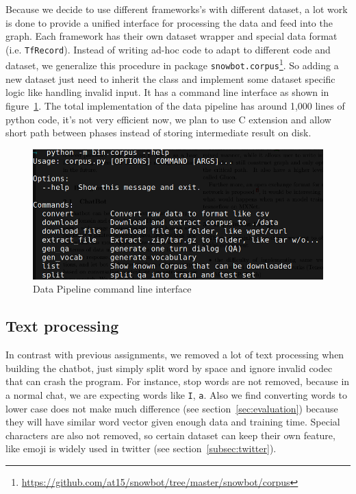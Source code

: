 \documentclass{article}
\begin{document}
Because we decide to use different frameworks's with different dataset, a lot work is done to provide a unified interface
for processing the data and feed into the graph.
Each framework has their own dataset wrapper and special data format (i.e. \verb+TfRecord+).
Instead of writing ad-hoc code to adapt to different code and dataset,
we generalize this procedure in package \verb+snowbot.corpus+\footnote{\url{https://github.com/at15/snowbot/tree/master/snowbot/corpus}}.
So adding a new dataset just need to inherit the class and implement some dataset specific logic like handling invalid input.
It has a command line interface as shown in figure~\ref{fig:data-pipeline}.
The total implementation of the data pipeline has around 1,000 lines of python code,
it's not very efficient now, we plan to use C extension and allow short path between phases instead of storing intermediate result on disk.

\begin{figure}[h]
    \centering
    \includegraphics[width=\columnwidth]{data-pipeline}
    \caption{Data Pipeline command line interface}
    \label{fig:data-pipeline}
\end{figure}

\subsection{Text processing}
\label{subsec:text-processing}

In contrast with previous assignments, we removed a lot of text processing when building the chatbot,
just simply split word by space and ignore invalid codec that can crash the program.
For instance, stop words are not removed, because in a normal chat, we are expecting words like \verb+I+, \verb+a+.
Also we find converting words to lower case does not make much difference (see section~\ref{sec:evaluation}) because
they will have similar word vector given enough data and training time.
Special characters are also not removed, so certain dataset can keep their own feature, like emoji is widely used in twitter
(see section~\ref{subsec:twitter}).
\end{document}
